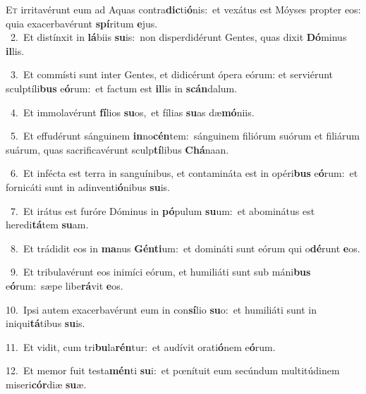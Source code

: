 \lettrine{\initial\textcolor{\initialcolor}{E}}{t} irritavérunt eum ad Aquas contra\-\textbf{dic}\-ti\-\textbf{ó}\-nis:~\star et vexátus est Móyses propter eos: quia exacerbavérunt \textbf{spí}\-ritum \textbf{e}\-jus.\\
{\numbfont\textcolor{\numbcolor}{~2.}}~Et distínxit in \textbf{lá}\-biis \textbf{su}\-is:~\star non disperdidérunt Gentes, quas dixit \textbf{Dó}\-minus \textbf{il}\-lis.\par
{\numbfont\textcolor{\numbcolor}{~3.}}~Et commísti sunt inter Gentes, et didicérunt ópera eórum: et serviérunt sculptíli\textbf{bus} e\-\textbf{ó}\-rum:~\star et factum est \textbf{il}\-lis in \textbf{scán}\-dalum.\par
{\numbfont\textcolor{\numbcolor}{~4.}}~Et immolavérunt \textbf{fí}\-lios \textbf{su}\-os,~\star et fílias \textbf{su}\-as dæ\-\textbf{mó}\-niis.\par
{\numbfont\textcolor{\numbcolor}{~5.}}~Et effudérunt sánguinem \textbf{in}\-no\-\textbf{cén}\-tem:~\star sánguinem filiórum suórum et filiárum suárum, quas sacrificavérunt sculp\-\textbf{tí}\-libus \textbf{Chá}\-naan.\par
{\numbfont\textcolor{\numbcolor}{~6.}}~Et infécta est terra in sanguínibus, et contamináta est in opéri\textbf{bus} e\-\textbf{ó}\-rum:~\star et fornicáti sunt in adinventi\-\textbf{ó}\-nibus \textbf{su}\-is.\par
{\numbfont\textcolor{\numbcolor}{~7.}}~Et irátus est furóre Dóminus in \textbf{pó}\-pulum \textbf{su}\-um:~\star et abominátus est heredi\-\textbf{tá}\-tem \textbf{su}\-am.\par
{\numbfont\textcolor{\numbcolor}{~8.}}~Et trádidit eos in \textbf{ma}\-nus \textbf{Gén}\-\textbf{ti}um:~\star et domináti sunt eórum qui o\-\textbf{dé}\-runt \textbf{e}\-os.\par
{\numbfont\textcolor{\numbcolor}{~9.}}~Et tribulavérunt eos inimíci eórum, et humiliáti sunt sub máni\textbf{bus} e\-\textbf{ó}\-rum:~\star sæpe libe\-\textbf{rá}\-vit \textbf{e}\-os.\par
{\numbfont\textcolor{\numbcolor}{10.}}~Ipsi autem exacerbavérunt eum in con\-\textbf{sí}\-lio \textbf{su}\-o:~\star et humiliáti sunt in iniqui\-\textbf{tá}\-tibus \textbf{su}\-is.\par
{\numbfont\textcolor{\numbcolor}{11.}}~Et vidit, cum tri\-\textbf{bu}\-la\-\textbf{rén}\-tur:~\star et audívit orati\-\textbf{ó}\-nem e\-\textbf{ó}\-rum.\par
{\numbfont\textcolor{\numbcolor}{12.}}~Et memor fuit testa\-\textbf{mén}\-ti \textbf{su}\-i:~\star et pœnítuit eum secúndum multitúdinem miseri\-\textbf{cór}\-diæ \textbf{su}\-æ.\par
